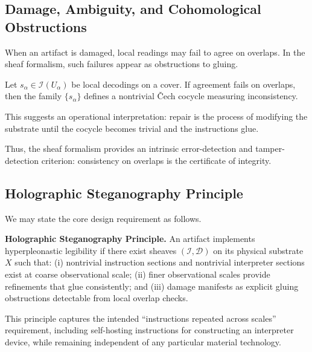 \documentclass[11pt]{article}
\begin{document}
\subsection{Damage, Ambiguity, and Cohomological Obstructions}

When an artifact is damaged, local readings may fail to agree on
overlaps. In the sheaf formalism, such failures appear as obstructions
to gluing.

Let $s_\alpha \in \mathscr{I}(U_\alpha)$ be local decodings on a cover.
If agreement fails on overlaps, then the family $\{s_\alpha\}$ defines a
nontrivial \v{C}ech cocycle measuring inconsistency.

This suggests an operational interpretation: repair is the process of
modifying the substrate until the cocycle becomes trivial and the
instructions glue.

Thus, the sheaf formalism provides an intrinsic error-detection and
tamper-detection criterion: consistency on overlaps is the certificate of
integrity.

\subsection{Holographic Steganography Principle}

We may state the core design requirement as follows.

\medskip
\noindent
\textbf{Holographic Steganography Principle.}
An artifact implements hyperpleonastic legibility if there exist sheaves
$(\mathscr{I},\mathscr{D})$ on its physical substrate $X$ such that:
(i) nontrivial instruction sections and nontrivial interpreter sections
exist at coarse observational scale; (ii) finer observational scales
provide refinements that glue consistently; and (iii) damage manifests as
explicit gluing obstructions detectable from local overlap checks.

\medskip

This principle captures the intended ``instructions repeated across
scales'' requirement, including self-hosting instructions for constructing
an interpreter device, while remaining independent of any particular
material technology.
\end{document}
